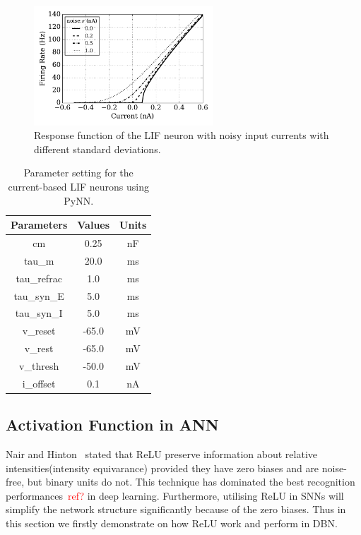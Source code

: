 	\begin{figure}
		\centering
		\includegraphics[width=0.6\textwidth]{pics_iconip/1.pdf}
		\caption{Response function of the LIF neuron with noisy input currents with different standard deviations.}
		\label{Fig:physics}
	\end{figure}
	
	\begin{table}[bt]
		\centering
		\caption{\label{tbl:pynnConfig}Parameter setting for the current-based LIF neurons using PyNN.}
		\bgroup
		\def\arraystretch{1.4}
		\begin{tabular}{c c c}
					Parameters & Values & Units \\
					\hline
					cm & 0.25 & nF	\\
					tau\_m & 20.0 & ms\\
					tau\_refrac & 1.0 & ms\\
					tau\_syn\_E & 5.0 & ms\\
					tau\_syn\_I & 5.0 & ms\\
					v\_reset & -65.0 & mV\\
					v\_rest & -65.0 & mV\\
					v\_thresh & -50.0 & mV\\
					i\_offset & 0.1 & nA\\
			\hline
		\end{tabular}
		\egroup
	\end{table}

	\subsection{Activation Function in ANN}
	\label{sec:activation}
	Nair and Hinton~\cite{nair2010rectified} stated that ReLU preserve information about relative intensities(intensity equivarance) provided they have zero biases and are noise-free, but binary units do not.
	This technique has dominated the best recognition performances~\textcolor{red}{ref?} in deep learning.
	Furthermore, utilising ReLU in SNNs will simplify the network structure significantly because of the zero biases.
	Thus in this section we firstly demonstrate on how ReLU work and perform in DBN.
	
